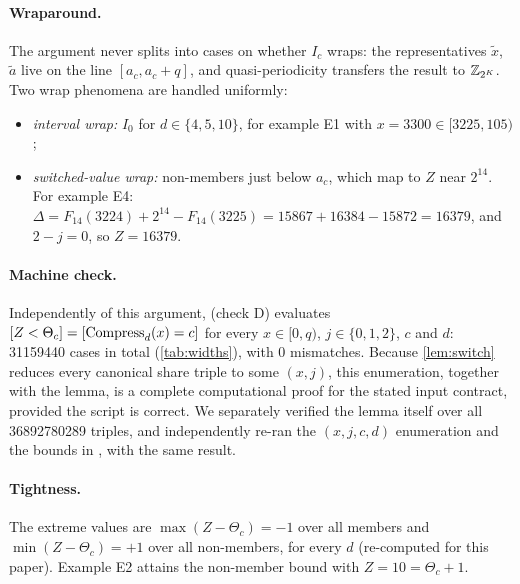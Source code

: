 \paragraph{Wraparound.} The argument never splits into cases on whether $I_c$ wraps: the representatives $\tilde x$, $\tilde a$ live on the line $[a_c, a_c + q]$, and quasi-periodicity transfers the result to $\mathbb{Z}_{2^K}$. Two wrap phenomena are handled uniformly:
\begin{itemize}
  \item \emph{interval wrap:} $I_0$ for $d \in \{4, 5, 10\}$, for example E1 with $x = 3300 \in [3225, 105)$;
  \item \emph{switched-value wrap:} non-members just below $a_c$, which map to $Z$ near $2^{14}$. For example E4: $\Delta = F_{14}(3224) + 2^{14} - F_{14}(3225) = 15867 + 16384 - 15872 = 16379$, and $2 - j = 0$, so $Z = 16379$.
\end{itemize}

\paragraph{Machine check.} Independently of this argument,  (check D) evaluates $[Z < \Theta_c] = [\operatorname{Compress}_d(x) = c]$ for every $x \in [0, q)$, $j \in \{0, 1, 2\}$, $c$ and $d$: \num{31159440} cases in total (\cref{tab:widths}), with 0 mismatches. Because \cref{lem:switch} reduces every canonical share triple to some $(x, j)$, this enumeration, together with the lemma, is a complete computational proof for the stated input contract, provided the script is correct. We separately verified the lemma itself over all \num{36892780289} triples, and independently re-ran the $(x, j, c, d)$ enumeration and the bounds in , with the same result.

\paragraph{Tightness.} The extreme values are $\max(Z - \Theta_c) = -1$ over all members and $\min(Z - \Theta_c) = +1$ over all non-members, for every $d$ (re-computed for this paper). Example E2 attains the non-member bound with $Z = 10 = \Theta_c + 1$.

